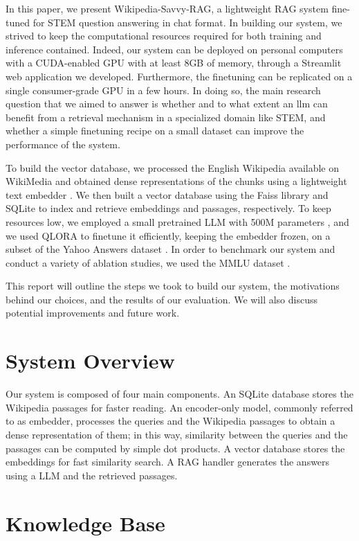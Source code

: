\documentclass[11pt]{article}
\begin{document}
In this paper, we present Wikipedia-Savvy-RAG, a lightweight RAG system fine-tuned for STEM question answering
in chat format. In building our system, we strived to keep the computational resources required for both
training and inference contained. Indeed, our system can be deployed on personal computers with a CUDA-enabled GPU
with at least 8GB of memory, through a Streamlit web application we developed. Furthermore, the finetuning can 
be replicated on a single consumer-grade GPU in a few hours. In doing so, the main research question that we aimed to
answer is whether and to what extent an llm can benefit from a retrieval mechanism in a specialized domain like STEM,
and whether a simple finetuning recipe on a small dataset can improve the performance of the system.

To build the vector database, we processed the English Wikipedia available on WikiMedia \cite{wikimedia} and obtained 
dense representations of the chunks using a lightweight text embedder \cite{baai}. We then built a vector database using
the Faiss library \cite{faiss} and SQLite \cite{sqlite} to index and retrieve embeddings and passages, respectively. To keep resources low,
we employed a small pretrained LLM with 500M parameters \cite{qwen}, and we used QLORA \cite{qlora} to finetune it efficiently, 
keeping the embedder frozen, on a subset of the Yahoo Answers dataset \cite{yahoo_answers}.
In order to benchmark our system and conduct a variety of ablation studies, we used the MMLU dataset \cite{mmlu}.

This report will outline the steps we took to build our system, the motivations behind our choices, and the results of our evaluation.
We will also discuss potential improvements and future work.

\section{System Overview}
Our system is composed of four main components.
An SQLite database stores the Wikipedia passages for faster reading.
An encoder-only model, commonly referred to as embedder, processes the queries and the 
Wikipedia passages to obtain a dense representation of them; in this way, similarity 
between the queries and the passages can be computed by simple dot products.
A vector database stores the embeddings for fast similarity search.
A RAG handler generates the answers using a LLM and the retrieved passages.

\section{Knowledge Base}
\end{document}
